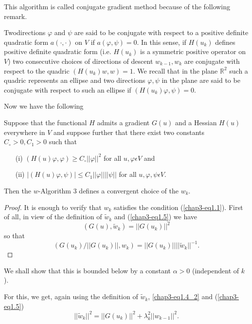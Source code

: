 This algorithm is called conjugate gradient method because of the following remark.

\begin{remark}\label{chap3-rem1.2}
Two\pageoriginale directions $\varphi$ and $\psi$ are said to be conjugate with respect to a positive definite quadratic form $a(\cdot , \cdot)$ on $V$ if $a(\varphi, \psi) = 0$. In this sense, if $H(u_{k})$ defines positive definite quadratic form (i.e. $H(u_{k})$ is a symmetric positive operator on $V$) two consecutive  choices of directions of descent $w_{k-1}, w_{k}$ are conjugate with respect to the quadric $(H(u_{k})w, w) = 1$. We recall that in the plane $\mathbb{R}^{2}$ such a quadric represents an ellipse and two directions $\varphi, \psi$ in the plane are said to be conjugate with respect to such an ellipse if $(H(u_{k})\varphi, \psi) = 0$.
\end{remark}

Now we have the following

\begin{proposition}\label{chap3-prop1.3}
Suppose that the functional $H$ admits a gradient $G(u)$ and a Hessian $H(u)$ everywhere in $V$ and suppose further that there exist two constants $C_{\circ} > 0, C_{1} > 0$ such that
\begin{enumerate}
\item[(i)] $(H(u) \varphi, \varphi) \geq C_{\circ} ||\varphi||^{2}$ for all $u, \varphi \epsilon V$ and
\item[(ii)] $|(H(u)\varphi, \psi)| \leq C_{1} ||\varphi|| ||\psi||$ for all $u, \varphi, \psi \epsilon V$.
\end{enumerate}
Then the $w$-Algorithm 3 defines a convergent choice of the $w_{k}$.
\end{proposition}

\begin{proof}
It is enough to verify that $w_{k}$ satisfies the condition (\ref{chap3-eq1.1}). First of all, in view of the definition of $\widetilde{w}_{k}$ and (\ref{chap3-eq1.5}) we have
$$
(G(u), \widetilde{w}_{k}) = ||G(u_{k})||^{2}
$$
so that
$$
(G(u_{k})/||G(u_{k})||, w_{k}) = ||G(u_{k})|| ||\widetilde{w}_{k}||^{-1}.
$$
\end{proof}

We shall show that this is bounded below by a constant $\alpha > 0$ (independent of $k$).

For this, we get, again using the definition of $\widetilde{w}_{k}$, \ref{chap3-eq1.4_2} and (\ref{chap3-eq1.5})
$$
||\widetilde{w}_{k}||^{2} = ||G(u_{k})||^{2} + \lambda_{k}^{2} ||w_{k-1}||^{2}.
$$

